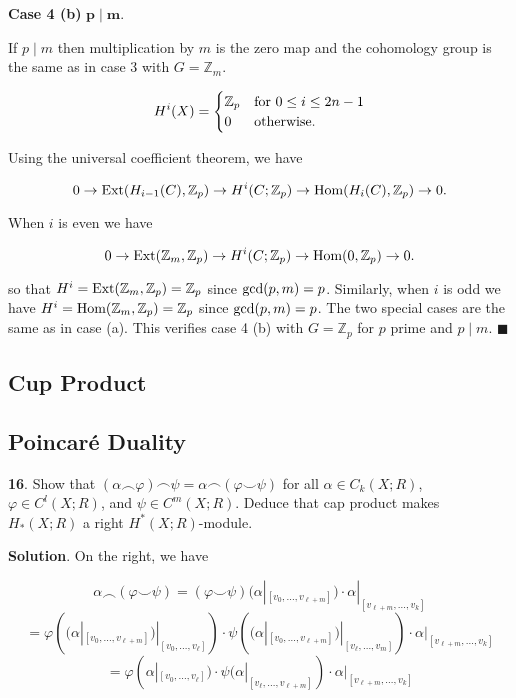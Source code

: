 \documentclass{article}
\newcommand{\Z}{\mathbb{Z}}
\newcommand{\Hom}{\textnormal{Hom}}
\newcommand{\Ext}{\textnormal{Ext}}
\begin{document}
\textbf{Case 4 (b)} $\mathbf{p\mid m}$.

If $p\mid m$ then multiplication by $m$ is the zero map and the cohomology group is the same as in case 3 with $G = \Z_{m}$.

\[H^{i}(X) = \begin{cases} \Z_{p} & \textnormal{for } 0\leq i\leq 2n-1\\
0 & \textnormal{otherwise}. \end{cases}\]
\medskip

Using the universal coefficient theorem, we have

$$0\to \Ext(H_{i-1}(C), \Z_{p})\to H^{i}(C;\Z_{p})\to \Hom(H_{i}(C),\Z_{p})\to 0.$$

When $i$ is even we have

$$0\to \Ext(\Z_{m}, \Z_{p})\to H^{i}(C;\Z_{p})\to \Hom(0,\Z_{p})\to 0.$$

so that $H^{i} = \Ext(\Z_{m},\Z_{p}) = \Z_{p}$ since $\textnormal{gcd}(p, m) = p$. Similarly, when $i$ is odd we have $H^{i} = \Hom(\Z_{m},\Z_{p}) = \Z_{p}$ since $\textnormal{gcd}(p, m) = p$. The two special cases are the same as in case (a). This verifies case 4 (b) with $G = \Z_{p}$ for $p$ prime and $p\mid m$. $\blacksquare$
\bigskip
\bigskip

\subsection{Cup Product}

\subsection{Poincaré Duality}

\tab\textbf{16}. Show that $(\alpha\frown \varphi)\frown \psi = \alpha \frown (\varphi\smile \psi)$ for all $\alpha\in C_{k}(X;R)$, $\varphi\in C^{l}(X; R)$, and $\psi\in C^{m}(X;R)$. Deduce that cap product makes $H_{\ast}(X;R)$ a right $H^{\ast}(X;R)$-module.
\medskip

\textbf{Solution}. On the right, we have

$$\alpha\frown(\varphi\smile \psi) = (\varphi\smile \psi)(\alpha|_{[v_{0},\ldots,v_{\ell+m}]})\cdot \alpha|_{[v_{\ell+m},\ldots, v_{k}]}$$
$$=\varphi\left((\alpha|_{[v_{0},\ldots,v_{\ell+m}]})|_{[v_{0},\ldots,v_{\ell}]}\right)\cdot \psi\left((\alpha|_{[v_{0},\ldots,v_{\ell+m}]})|_{[v_{\ell},\ldots,v_{m}]}\right)\cdot \alpha|_{[v_{\ell+m},\ldots, v_{k}]}$$
$$=\varphi(\alpha|_{[v_{0},\ldots,v_{\ell}]})\cdot \psi(\alpha|_{[v_{\ell},\ldots,v_{\ell+m}]})\cdot \alpha|_{[v_{\ell+m},\ldots, v_{k}]}$$
\end{document}
